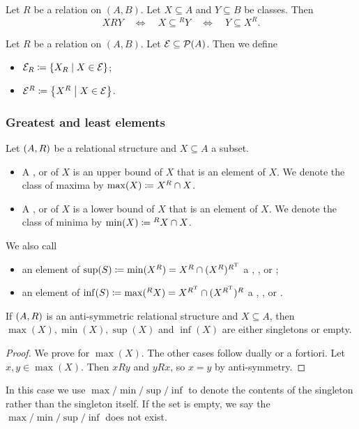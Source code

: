 \begin{lemma}
Let $R$ be a relation on $(A,B)$. Let $X\subseteq A$ and $Y\subseteq B$ be classes. Then
\[ XRY \quad\iff\quad X \subseteq {^RY} \quad\iff\quad Y \subseteq X^R. \]
\end{lemma}

\begin{definition}
Let $R$ be a relation on $(A,B)$. Let $\mathcal{E}\subseteq \operatorname{\mathcal{P}}(A)$. Then we define
\begin{itemize}
    \item $\mathcal{E}_R \coloneqq \left\{ X_R \;\middle|\; X\in \mathcal{E} \right\}$;
    \item $\mathcal{E}^R \coloneqq \left\{ X^R \;\middle|\; X\in \mathcal{E} \right\}$.
\end{itemize}
\end{definition}

\subsubsection{Greatest and least elements}
\begin{definition}
Let $\left( A, R \right)$ be a relational structure and $X\subseteq A$ a subset.
\begin{itemize}
\item A ,  or  of $X$ is an upper bound of $X$ that is an element of $X$. We denote the class of maxima by $\max(X) \coloneqq X^R\cap X$.
\item A ,  or  of $X$ is a lower bound of $X$ that is an element of $X$. We denote the class of minima by $\min(X) \coloneqq {^RX}\cap X$.
\end{itemize}
We also call
\begin{itemize}
\item an element of $\sup(S) \coloneqq \min(X^R) = X^R \cap (X^R)^{R^{\mathrm{T}}}$ a , , or ;
\item an element of $\inf(S) \coloneqq \max({^RX}) = X^{R^{\mathrm{T}}} \cap (X^{R^{\mathrm{T}}})^R$ a , , or .
\end{itemize}
\end{definition}

\begin{lemma} \label{minMaxSingletons}
If $\left( A, R \right)$ is an anti-symmetric relational structure and $X\subseteq A$, then $\max(X), \min(X), \sup(X)$ and $\inf(X)$ are either singletons or empty.
\end{lemma}
\begin{proof}
We prove for $\max(X)$. The other cases follow dually or a fortiori. Let $x,y\in \max(X)$. Then $xRy$ and $yRx$, so $x=y$ by anti-symmetry.
\end{proof}
In this case we use $\max/\min/\sup/\inf$ to denote the contents of the singleton rather than the singleton itself. If the set is empty, we say the $\max/\min/\sup/\inf$ does not exist.


